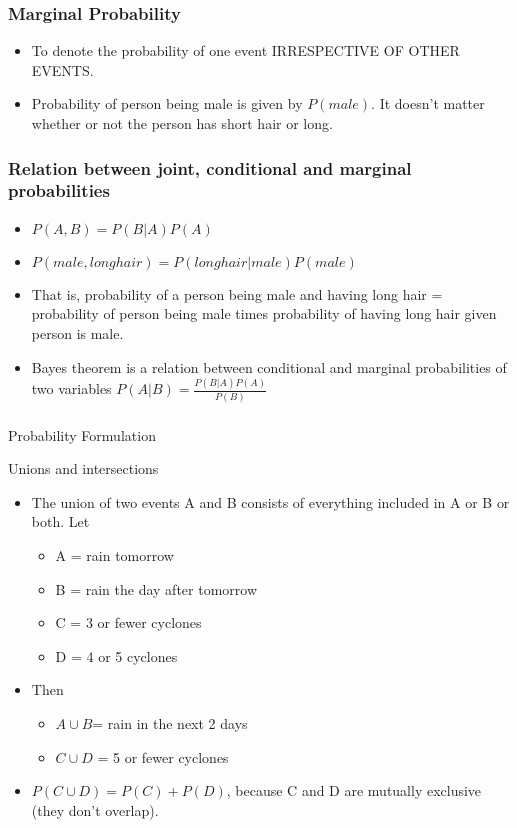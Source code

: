 \begin{frame}
\frametitle{Marginal Probability}
\begin{itemize}
\item  To denote the probability of one event IRRESPECTIVE OF OTHER EVENTS.
\item  Probability of person being male is given by $P(male)$. It doesn't matter whether or not the person has short hair or long.
\end{itemize}
\end{frame}

\begin{frame}
\frametitle{Relation between joint, conditional and marginal probabilities}


\begin{itemize}
\item  $P(A,B) = P(B|A)P(A)$
\item $P(male,long hair)=P(long hair|male) P(male)$
\item That is, probability of a person being male and having long hair =
probability of person being male times probability of having long hair
given person is male.
\item Bayes theorem is a relation between conditional and marginal probabilities of two
variables $P(A|B) = \frac{P(B|A)P(A)}{P(B)}$
\end{itemize}
\end{frame}

\begin{frame}[fragile]\frametitle{}
\begin{center}
{\Large Probability Formulation}
\end{center}
\end{frame}


\begin{frame}{Unions and intersections }

\begin{itemize}
\item The union of two events A and B consists of everything included in A 
or B or both. Let  
\begin{itemize}
\item A = rain tomorrow
\item  B = rain the day after tomorrow
\item C = 3 or fewer cyclones
\item D = 4 or 5 cyclones
\end{itemize}
\item Then  
\begin{itemize}
\item $A \cup B$= rain in the next 2 days
\item $C \cup D$ = 5 or fewer cyclones
\end{itemize}
\item $ P(C \cup D) = P(C) + P(D)$, because C and D  are mutually exclusive 
(they don't overlap). 
\end{itemize}
\end{frame}


